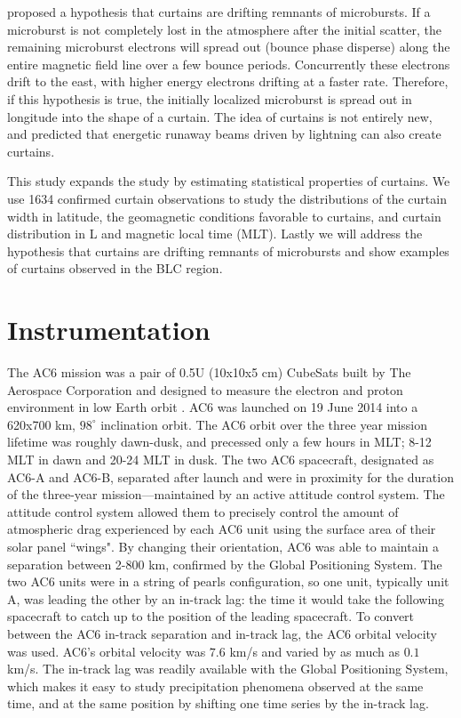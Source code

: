 \documentclass[draft]{agujournal2019}
\begin{document}
 proposed a hypothesis that curtains are drifting remnants of microbursts. If a microburst is not completely lost in the atmosphere after the initial scatter, the remaining microburst electrons will spread out (bounce phase disperse) along the entire magnetic field line over a few bounce periods. Concurrently these electrons drift to the east, with higher energy electrons drifting at a faster rate. Therefore, if this hypothesis is true, the initially localized microburst is spread out in longitude into the shape of a curtain. The idea of curtains is not entirely new, and  predicted that energetic runaway beams driven by lightning can also create curtains.

This study expands the  study by estimating statistical properties of curtains. We use 1634 confirmed curtain observations to study the distributions of the curtain width in latitude, the geomagnetic conditions favorable to curtains, and curtain distribution in L and magnetic local time (MLT). Lastly we will address the hypothesis that curtains are drifting remnants of microbursts and show examples of curtains observed in the BLC region.

\section{Instrumentation} \label{instrumentation}
The AC6 mission was a pair of 0.5U (10x10x5 cm) CubeSats built by The Aerospace Corporation and designed to measure the electron and proton environment in low Earth orbit \cite{O'brien2016}. AC6 was launched on 19 June 2014 into a 620x700 km, $98^\circ$ inclination orbit. The AC6 orbit over the three year mission lifetime was roughly dawn-dusk, and precessed only a few hours in MLT; 8-12 MLT in dawn and 20-24 MLT in dusk. The two AC6 spacecraft, designated as AC6-A and AC6-B, separated after launch and were in proximity for the duration of the three-year mission---maintained by an active attitude control system. The attitude control system allowed them to precisely control the amount of atmospheric drag experienced by each AC6 unit using the surface area of their solar panel ``wings". By changing their orientation, AC6 was able to maintain a separation between 2-800 km, confirmed by the Global Positioning System. The two AC6 units were in a string of pearls configuration, so one unit, typically unit A, was leading the other by an in-track lag: the time it would take the following spacecraft to catch up to the position of the leading spacecraft. To convert between the AC6 in-track separation and in-track lag, the AC6 orbital velocity was used. AC6's orbital velocity was $7.6$ km/s and varied by as much as $0.1$ km/s. The in-track lag was readily available with the Global Positioning System, which makes it easy to study precipitation phenomena observed at the same time, and at the same position by shifting one time series by the in-track lag.
\end{document}
